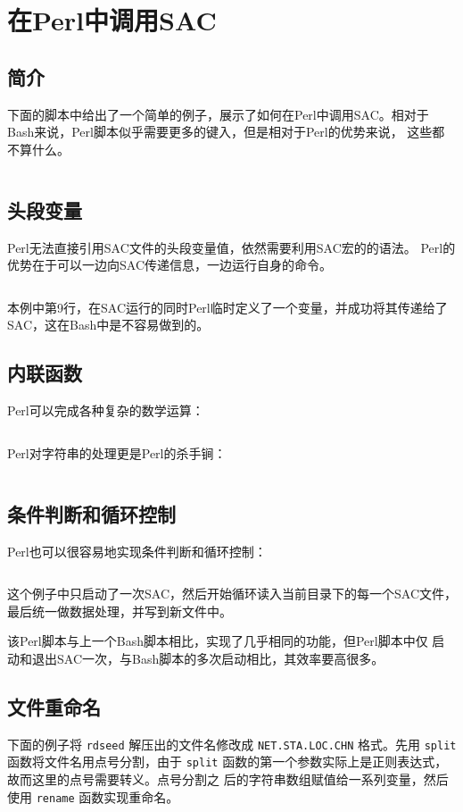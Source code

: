\section{在Perl中调用SAC}
\label{sec:sac-perl}

\subsection{简介}
下面的脚本中给出了一个简单的例子，展示了如何在Perl中调用SAC。相对于
Bash来说，Perl脚本似乎需要更多的键入，但是相对于Perl的优势来说，
这些都不算什么。
\inputminted{perl}{./call-in-script/simple-script.pl}

\subsection{头段变量}
Perl无法直接引用SAC文件的头段变量值，依然需要利用SAC宏的的语法。
Perl的优势在于可以一边向SAC传递信息，一边运行自身的命令。
\inputminted{perl}{./call-in-script/variables.pl}
本例中第9行，在SAC运行的同时Perl临时定义了一个变量，并成功将其传递给了
SAC，这在Bash中是不容易做到的。

\subsection{内联函数}
Perl可以完成各种复杂的数学运算：
\inputminted{perl}{./call-in-script/arithmetic-functions.pl}

Perl对字符串的处理更是Perl的杀手锏：
\inputminted{perl}{./call-in-script/string-functions.pl}

\subsection{条件判断和循环控制}
Perl也可以很容易地实现条件判断和循环控制：
\inputminted{perl}{./call-in-script/do-loops.pl}
这个例子中只启动了一次SAC，然后开始循环读入当前目录下的每一个SAC文件，
最后统一做数据处理，并写到新文件中。

该Perl脚本与上一个Bash脚本相比，实现了几乎相同的功能，但Perl脚本中仅
启动和退出SAC一次，与Bash脚本的多次启动相比，其效率要高很多。

\subsection{文件重命名}
\label{subsec:rename-in-perl}
下面的例子将 \texttt{rdseed} 解压出的文件名修改成 \texttt{NET.STA.LOC.CHN}
格式。先用 \texttt{split} 函数将文件名用点号分割，由于 \texttt{split}
函数的第一个参数实际上是正则表达式，故而这里的点号需要转义。点号分割之
后的字符串数组赋值给一系列变量，然后使用 \texttt{rename} 函数实现重命名。
\inputminted{perl}{./call-in-script/rename1.pl}

